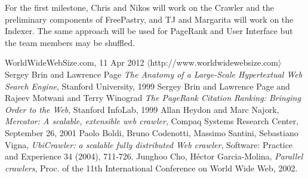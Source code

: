 \documentclass[11pt, letterpaper, oneside, twocolumn]{article}
\begin{document}
For the first milestone, Chris and Nikos will work on the Crawler and the preliminary components of FreePastry, and TJ and Margarita will work on the Indexer.
The same approach will be used for PageRank and User Interface but the team members may be shuffled.

\begin{thebibliography}{9}

   WorldWideWebSize.com, 11 Apr 2012 $\langle$http://www.worldwidewebsize.com$\rangle$
   Sergey Brin and Lawrence Page \emph{The Anatomy of a Large-Scale Hypertextual Web Search Engine}, Stanford University, 1999
   Sergey Brin and  Lawrence Page and Rajeev Motwani and Terry Winograd \emph{The PageRank Citation Ranking: Bringing Order to the Web}, Stanford InfoLab, 1999
   Allan Heydon and Marc Najork, \emph{Mercator: A scalable, extensible web crawler}, Compaq Systems Research Center, September 26, 2001
   Paolo Boldi, Bruno Codenotti, Massimo Santini, Sebastiano Vigna, \emph{UbiCrawler: a scalable fully distributed Web crawler}, Software: Practice and Experience 34 (2004), 711-726.
   Junghoo Cho, H\'{e}ctor Garcia-Molina, \emph{Parallel crawlers}, Proc. of the 11th International Conference on World Wide Web, 2002.


\end{thebibliography}
\end{document}
